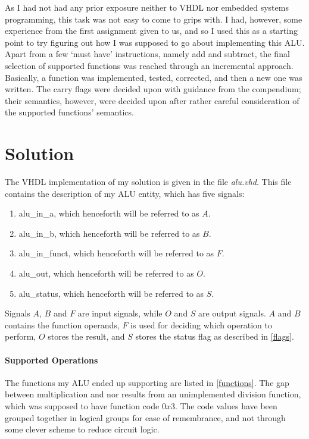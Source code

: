 \documentclass{article}
\begin{document}
As I had not had any prior exposure neither to VHDL nor embedded systems programming, this task was not easy to come to grips with. I had, however, some experience from the first assignment given to us, and so I used this as a starting point to try figuring out how I was supposed to go about implementing this ALU. Apart from a few `must have' instructions, namely add and subtract, the final selection of supported functions was reached through an incremental approach. Basically, a function was implemented, tested, corrected, and then a new one was written. The carry flags were decided upon with guidance from the compendium; their semantics, however, were decided upon after rather careful consideration of the supported functions' semantics. 

\section{Solution}
\label{sec:solution}
The VHDL implementation of my solution is given in the file \emph{alu.vhd}. This file contains the description of my ALU entity, which has five signals:
\begin{enumerate}
\item alu_in_a, which henceforth will be referred to as $A$.
\item alu_in_b, which henceforth will be referred to as $B$.
\item alu_in_funct, which henceforth will be referred to as $F$.
\item alu_out, which henceforth will be referred to as $O$.
\item alu_status, which henceforth will be referred to as $S$.
\end{enumerate}
Signals $A$, $B$ and $F$ are input signals, while $O$ and $S$ are output signals. $A$ and $B$ contains the function operands, $F$ is used for deciding which operation to perform, $O$ stores the result, and $S$ stores the status flag as described in \autoref{flags}.

\paragraph{Supported Operations}
\label{ops}
The functions my ALU ended up supporting are listed in \autoref{functions}. The gap between multiplication and nor results from an unimplemented division function, which was supposed to have function code $0x3$. The code values have been grouped together in logical groups for ease of remembrance, and not through some clever scheme to reduce circuit logic.
\end{document}
